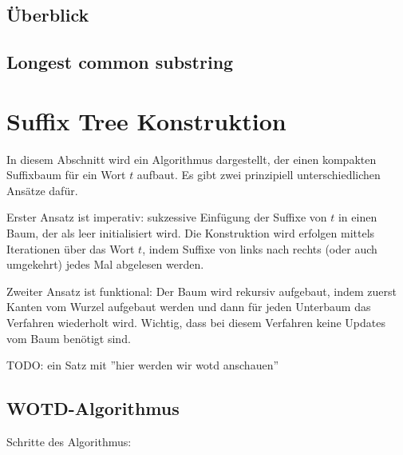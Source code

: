 \documentclass[12pt]{report}
\begin{document}
\subsection{Überblick}
\label{sec:Ueberblick}

\subsection{Longest common substring}
\label{sec:longestCommonSubstring}

\section{Suffix Tree Konstruktion}
\label{sec:SuffixTreeKonstruktion}

In diesem Abschnitt wird ein Algorithmus dargestellt, der einen kompakten Suffixbaum für ein Wort $t$ aufbaut. Es gibt zwei prinzipiell unterschiedlichen Ansätze dafür.

Erster Ansatz ist imperativ: sukzessive Einfügung der Suffixe von $t$ in einen Baum, der als leer initialisiert wird. Die Konstruktion wird erfolgen mittels Iterationen über das Wort $t$, indem Suffixe von links nach rechts (oder auch umgekehrt) jedes Mal abgelesen werden.

Zweiter Ansatz ist funktional: Der Baum wird rekursiv aufgebaut, indem zuerst Kanten vom Wurzel aufgebaut werden und dann für jeden Unterbaum das Verfahren wiederholt wird. Wichtig, dass bei diesem Verfahren keine Updates vom Baum benötigt sind.

TODO: ein Satz mit ''hier werden wir wotd anschauen''


\subsection{WOTD-Algorithmus}
\label{sec:WOTDAlgorithmus}

Schritte des Algorithmus:
\end{document}
